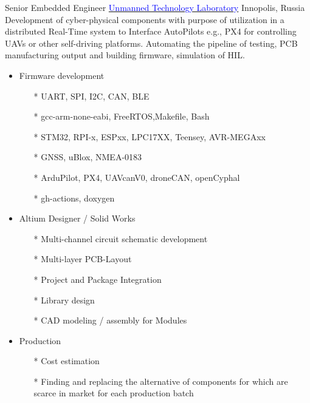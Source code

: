         {Senior Embedded Engineer}
        {\href{https://robotics.innopolis.university/en/labs/laboratoriya-bespilotnyh-technologyi/}{\textcolor{blue}{Unmanned Technology Laboratory}}}
        {Innopolis, Russia}
        {
        \newline
        Development of cyber-physical components with purpose of utilization in a distributed Real-Time system to Interface AutoPilots e.g., PX4 for controlling UAVs or other self-driving platforms. Automating the pipeline of testing, PCB manufacturing output and building firmware, simulation of HIL.
        } 
        {
        \begin{itemize}
            \item Firmware development
            \begin{itemize}
                \item[*] UART, SPI, I2C, CAN, BLE
                \item[*] gcc-arm-none-eabi, FreeRTOS,Makefile, Bash
                \item[*] STM32, RPI-x, ESPxx, LPC17XX, Teensey, AVR-MEGAxx 
                \item[*] GNSS, uBlox, NMEA-0183
                \item[*] ArduPilot, PX4, UAVcanV0, droneCAN, openCyphal
                \item[*] gh-actions, doxygen
            \end{itemize}
            \item Altium Designer / Solid Works \begin{itemize}
                \item[*] Multi-channel circuit schematic development
                \item[*] Multi-layer PCB-Layout
                \item[*] Project and Package Integration
                \item[*] Library design
                \item[*] CAD modeling / assembly for Modules
            \end{itemize}
            \item Production 
            \begin{itemize}
            \item[*] Cost estimation 
            \item[*] Finding and replacing the alternative of components for which are scarce in market for each production batch
            \end{itemize} 
        \end{itemize}
        }
